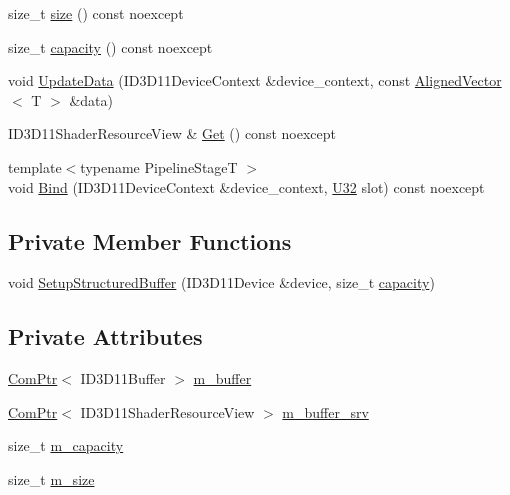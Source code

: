 \begin{DoxyCompactItemize}
\item 
size\+\_\+t \mbox{\hyperlink{classmage_1_1rendering_1_1_structured_buffer_aa7e7d6cc81b608d6333cd2c659189605}{size}} () const noexcept
\item 
size\+\_\+t \mbox{\hyperlink{classmage_1_1rendering_1_1_structured_buffer_aa7b9ec40ba586d8f4a063926d4924b70}{capacity}} () const noexcept
\item 
void \mbox{\hyperlink{classmage_1_1rendering_1_1_structured_buffer_af08d78a68111bc28890eb10610db8a73}{Update\+Data}} (I\+D3\+D11\+Device\+Context \&device\+\_\+context, const \mbox{\hyperlink{namespacemage_a8664bfb5ce2179fc64eae9f82c8a5ba8}{Aligned\+Vector}}$<$ T $>$ \&data)
\item 
I\+D3\+D11\+Shader\+Resource\+View \& \mbox{\hyperlink{classmage_1_1rendering_1_1_structured_buffer_af7e538ca119896eb776d0da6b18029ea}{Get}} () const noexcept
\item 
{\footnotesize template$<$typename Pipeline\+StageT $>$ }\\void \mbox{\hyperlink{classmage_1_1rendering_1_1_structured_buffer_aeef55c61fc5331b08c3ae2cba8f8de64}{Bind}} (I\+D3\+D11\+Device\+Context \&device\+\_\+context, \mbox{\hyperlink{namespacemage_a41c104c036fba3756a74e19f793eeaa1}{U32}} slot) const noexcept
\end{DoxyCompactItemize}
\subsection*{Private Member Functions}
\begin{DoxyCompactItemize}
\item 
void \mbox{\hyperlink{classmage_1_1rendering_1_1_structured_buffer_a41ed97f1fd3e77ba18abf25e957e82b2}{Setup\+Structured\+Buffer}} (I\+D3\+D11\+Device \&device, size\+\_\+t \mbox{\hyperlink{classmage_1_1rendering_1_1_structured_buffer_aa7b9ec40ba586d8f4a063926d4924b70}{capacity}})
\end{DoxyCompactItemize}
\subsection*{Private Attributes}
\begin{DoxyCompactItemize}
\item 
\mbox{\hyperlink{namespacemage_ae74f374780900893caa5555d1031fd79}{Com\+Ptr}}$<$ I\+D3\+D11\+Buffer $>$ \mbox{\hyperlink{classmage_1_1rendering_1_1_structured_buffer_a57a60148175840b9dbf8001c6f290994}{m\+\_\+buffer}}
\item 
\mbox{\hyperlink{namespacemage_ae74f374780900893caa5555d1031fd79}{Com\+Ptr}}$<$ I\+D3\+D11\+Shader\+Resource\+View $>$ \mbox{\hyperlink{classmage_1_1rendering_1_1_structured_buffer_a2dd3ced6cf7b58de6b76d8175a07ec68}{m\+\_\+buffer\+\_\+srv}}
\item 
size\+\_\+t \mbox{\hyperlink{classmage_1_1rendering_1_1_structured_buffer_aa693230d08fa2653ae3b445b7bd61617}{m\+\_\+capacity}}
\item 
size\+\_\+t \mbox{\hyperlink{classmage_1_1rendering_1_1_structured_buffer_a191b95f553629b613d987782cb71bb29}{m\+\_\+size}}
\end{DoxyCompactItemize}


